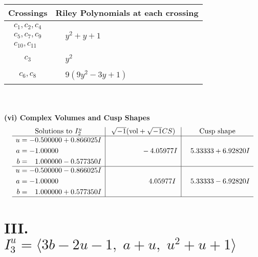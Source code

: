 \documentclass[1p]{elsarticle_modified}
\theoremstyle{definition}
\newcommand{\I}{\sqrt{-1}}
\begin{document}
\begin{tabular}{m{50pt}|m{274pt}}
Crossings & \hspace{64pt}Riley Polynomials at each crossing \\
\hline $$\begin{aligned}c_{1},c_{2},c_{4}\\c_{5},c_{7},c_{9}\\c_{10},c_{11}\end{aligned}$$&$\begin{aligned}
&y^2+y+1
\end{aligned}$\\
\hline $$\begin{aligned}c_{3}\end{aligned}$$&$\begin{aligned}
&y^2
\end{aligned}$\\
\hline $$\begin{aligned}c_{6},c_{8}\end{aligned}$$&$\begin{aligned}
&9(9 y^2-3 y+1)
\end{aligned}$\\
\hline
\end{tabular}\\~\\
\newpage\flushleft \textbf{(vi) Complex Volumes and Cusp Shapes}
$$\begin{array}{c|c|c}  
\text{Solutions to }I^u_{2}& \I (\text{vol} + \sqrt{-1}CS) & \text{Cusp shape}\\
 \hline 
\begin{aligned}
u &= -0.500000 + 0.866025 I \\
a &= -1.00000\phantom{ +0.000000I} \\
b &= \phantom{-}1.000000 - 0.577350 I\end{aligned}
 & \phantom{-0.000000 } -4.05977 I & \phantom{-}5.33333 + 6.92820 I \\ \hline\begin{aligned}
u &= -0.500000 - 0.866025 I \\
a &= -1.00000\phantom{ +0.000000I} \\
b &= \phantom{-}1.000000 + 0.577350 I\end{aligned}
 & \phantom{-0.000000 -}4.05977 I & \phantom{-}5.33333 - 6.92820 I\\
 \hline 
 \end{array}$$\newpage\newpage\renewcommand{\arraystretch}{1}
\centering \section*{III. $I^u_{3}= \langle 3 b-2 u-1,\;a+u,\;u^2+u+1 \rangle$}
\end{document}
